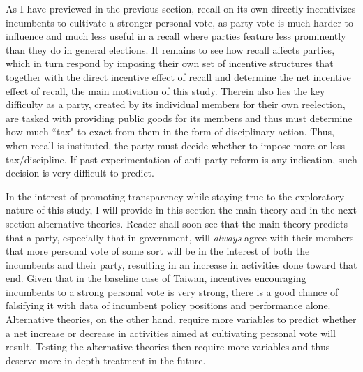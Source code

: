 \documentclass[hyphens, crop=false]{standalone}
\begin{document}
	As I have previewed in the previous section,
	recall on its own directly incentivizes
	incumbents to cultivate a stronger personal vote,
	as party vote is much harder to influence
	and much less useful in a recall where
	parties feature less prominently
	than they do in general elections.
	It remains to see how recall affects parties,
	which in turn respond by
	imposing their own set of incentive structures
	that together with the direct incentive effect of recall
	and determine the net incentive effect of recall,
	the main motivation of this study.
	Therein also lies the key difficulty as a party,
	created by its individual members for their own reelection,
	are tasked with providing public goods for its members
	and thus must determine how much ``tax" to exact from them
	in the form of disciplinary action.
	Thus,
	when recall is instituted,
	the party must decide whether to impose more or less tax/discipline. 
	If past experimentation of anti-party reform is any indication,
	such decision is very difficult to predict.
	
	In the interest of promoting transparency
	while staying true to the exploratory nature of this study,
	I will provide in this section the main theory and in the next section alternative theories.
	Reader shall soon see that the main theory predicts that
	a party, especially that in government,
	will \textit{always} agree with their members that
	more personal vote of some sort will be in the interest of
	both the incumbents and their party,
	resulting in an increase in activities done toward that end. 
	Given that in the baseline case of Taiwan,
	incentives encouraging incumbents to a strong personal vote is very strong,
	there is a good chance of falsifying it with
	data of incumbent policy positions and performance alone.
	Alternative theories,
	on the other hand,
	require more variables to predict whether a net increase or decrease in
	activities aimed at cultivating personal vote will result.
	Testing the alternative theories then
	require more variables
	and thus deserve more in-depth treatment in the future.
	

		
	
	
\end{document}
